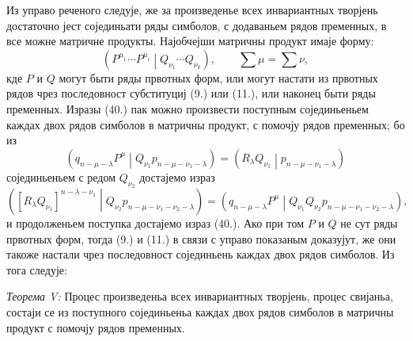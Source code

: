 \documentclass[11pt]{article}
\newcommand{\pair}[2]{\left(#1\middle|#2\right)}
\begin{document}
Из управо реченого следује, же за произведенье всех инвариантных творјень достаточно јест сојединьати ряды симболов, с додаваньем рядов пременных, в все можне матричне продукты. Најобчејши матричны продукт имаје форму:
\begin{equation}
 \pair{P^{\mu_1}\cdots P^{\mu_i}}{Q_{\nu_1}\cdots Q_{\nu_k}},
 \qquad \sum\mu=\sum\nu,
\tag{40}
\end{equation}
кде $P$ и $Q$ могут быти ряды првотных форм, или могут настати из првотных рядов чрез последовност субституциј (9.) или (11.), или наконец быти ряды пременных. Изразы (40.) пак можно произвести поступным сојединьеньем каждах двох рядов симболов в матричны продукт, с помочју рядов пременных; бо из
\[
 \pair{q_{n-\mu-\lambda}P^\mu}{Q_{\nu_1}p_{n-\mu-\nu_1-\lambda}}
 =\pair{R_\lambda Q_{\nu_1}}{p_{n-\mu-\nu_1-\lambda}}
\]
сојединьеньем с редом $Q_{\nu_2}$ достајемо израз
\[
 \pair{[R_\lambda Q_{\nu_1}]^{n-\lambda-\nu_1}}
 {Q_{\nu_2}p_{n-\mu-\nu_1-\nu_2-\lambda}}
 =\pair{q_{n-\mu-\lambda}P^\mu}
 {Q_{\nu_1}Q_{\nu_2}p_{n-\mu-\nu_1-\nu_2-\lambda}},
\]
и продолженьем поступка достајемо израз (40.). Ако при том $P$ и $Q$ не сут ряды првотных форм, тогда (9.) и (11.) в связи с управо показаным доказујут, же они такоже настали чрез последовност сојединьень каждах двох рядов симболов. Из тога следује:

\emph{Теорема V:} Процес произведеньа всех инвариантных творјень, процес свијаньа, состаји се из поступного сојединьеньа каждах двох рядов симболов в матричны продукт с помочју рядов пременных.
\end{document}
